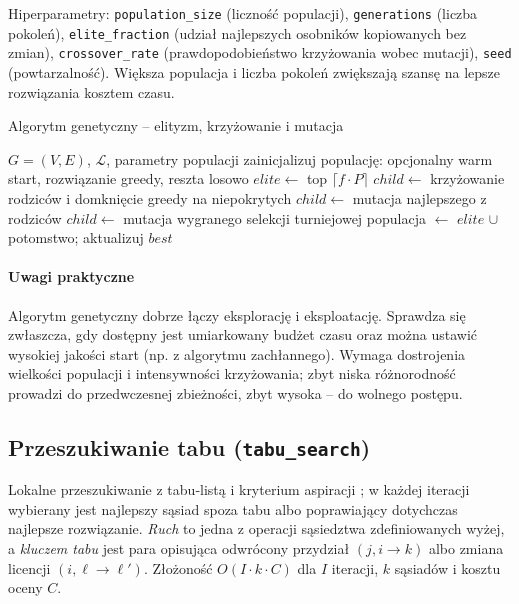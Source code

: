 Hiperparametry: \texttt{population\_size} (liczność populacji), \texttt{generations} (liczba pokoleń), \texttt{elite\_fraction} (udział najlepszych osobników kopiowanych bez zmian), \texttt{crossover\_rate} (prawdopodobieństwo krzyżowania wobec mutacji), \texttt{seed} (powtarzalność). Większa populacja i liczba pokoleń zwiększają szansę na lepsze rozwiązania kosztem czasu.

\begin{algorithm}[H]
\caption{Algorytm genetyczny – elityzm, krzyżowanie i mutacja}
\label{alg:ga}
\begin{algorithmic}[1]
\Require $G=(V,E)$, $\mathcal{L}$, parametry populacji
\State zainicjalizuj populację: opcjonalny warm start, rozwiązanie greedy, reszta losowo
  \State $elite \gets$ top $\lceil f\cdot P\rceil$
      \State $child\gets$ krzyżowanie rodziców i domknięcie greedy na niepokrytych
        \State $child\gets$ mutacja najlepszego z rodziców
      \EndIf
    \Else
      \State $child\gets$ mutacja wygranego selekcji turniejowej
    \EndIf
  \EndWhile
  \State populacja $\gets$ $elite$ $\cup$ potomstwo; aktualizuj $best$
\EndFor
\end{algorithmic}
\end{algorithm}

\paragraph{Uwagi praktyczne}
Algorytm genetyczny dobrze łączy eksplorację i eksploatację. Sprawdza się zwłaszcza, gdy dostępny jest umiarkowany budżet czasu oraz można ustawić wysokiej jakości start (np. z algorytmu zachłannego). Wymaga dostrojenia wielkości populacji i intensywności krzyżowania; zbyt niska różnorodność prowadzi do przedwczesnej zbieżności, zbyt wysoka – do wolnego postępu.

\subsection{Przeszukiwanie tabu (\texttt{tabu\_search})}\label{subsec:tabu}
Lokalne przeszukiwanie z tabu‑listą i kryterium aspiracji \cite{glover1989}; w każdej iteracji wybierany jest najlepszy sąsiad spoza tabu albo poprawiający dotychczas najlepsze rozwiązanie. \emph{Ruch} to jedna z operacji sąsiedztwa zdefiniowanych wyżej, a \emph{kluczem tabu} jest para opisująca odwrócony przydział $(j, i\to k)$ albo zmiana licencji $(i,\ell\to\ell')$. Złożoność $O(I\cdot k\cdot C)$ dla \(I\) iteracji, \(k\) sąsiadów i kosztu oceny \(C\).

